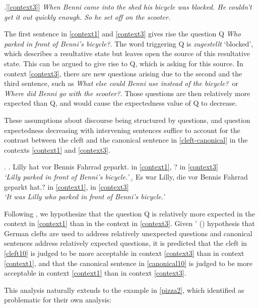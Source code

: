 \documentclass{salt}
\begin{document}
\ex.[\ref{context3}] \textit{When Benni came into the shed his bicycle was blocked. He couldn't get it out quickly enough. So he set off on the scooter.}

The first sentence in \ref{context1} and \ref{context3} gives rise the question Q \textit{Who parked in front of Benni's bicycle?}. The word triggering Q is \textit{zugestellt} `blocked', which describes a resultative state but leaves open the source of this resultative state. This can be argued to give rise to Q, which is asking for this source. In context \ref{context3}, there are new questions arising due to the second and the third sentence, such as \textit{What else could Benni use instead of the bicycle?}~or \textit{Where did Benni go with the scooter?}. Those questions are then relatively more expected than Q, and would cause the expectedness value of Q to decrease. 

These assumptions about discourse being structured by questions, and question expectedness decreasing with intervening sentences suffice to account for the contrast between the cleft and the canonical sentence in \ref{cleft-canonical} in the contexts \ref{context1} and \ref{context3}. 

\ex.\label{cleft-canonical}
 \a.\label{canonical10} Lilly hat vor Bennis Fahrrad geparkt.\hfill \checkmark\hspace{0.1em} in \ref{context1}, ? in \ref{context3}\\
\textit{`Lilly parked in front of Benni's bicycle.'}
\b.\label{cleft10} Es war Lilly, die vor Bennis Fahrrad geparkt hat.\hfill ? in \ref{context1}, \checkmark\hspace{0.1em} in \ref{context3}\\
\textit{`It was Lilly who parked in front of Benni's bicycle.'}

Following \cite{tonnis_2021}, we hypothesize that the question Q is relatively more expected in the context in \ref{context1} than in the context in \ref{context3}. Given \citeauthor{tonnis_2021}' (\citeyear{tonnis_2021}) hypothesis that German clefts are used to address relatively unexpected questions and canonical sentences address relatively expected questions, it is predicted that the cleft in \ref{cleft10} is judged to be more acceptable in context \ref{context3} than in context \ref{context1}, and that the canonical sentence in \ref{canonical10} is judged to be more acceptable in context \ref{context1} than in context \ref{context3}.

This analysis naturally extends to the example in \ref{pizza2}, which \cite{velleman_et_al_2012} identified as problematic for their own analysis:
\end{document}
